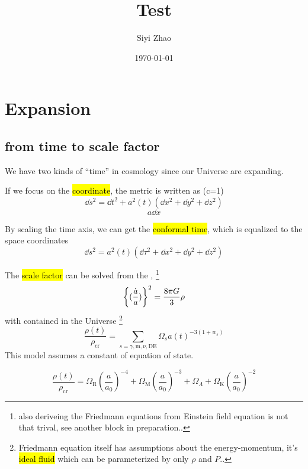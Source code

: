 
\title{Test}
\author{Siyi Zhao}
\date{\today}


\maketitle
\section{Expansion}

\subsection{from time to scale factor}

We have two kinds of ``time'' in cosmology since our Universe are expanding. 

If we focus on the \hl{coordinate}, the metric is written as (c=1)
\begin{equation}
    \dd s^2 = \dd t^2 + a^2(t) (\dd x^2 + \dd y^2 + \dd z^2)
\end{equation}
\begin{equation}
    a\dd{x}
\end{equation}


By scaling the time axis, we can get the \hl{conformal time}, which is equalized to the space coordinates
\begin{equation}
    \dd s^2 = a^2(t) (\dd \tau^2 + \dd x^2 + \dd y^2 + \dd z^2)
\end{equation}

The \hl{scale factor} can be solved from the , 
\footnote{also deriveing the Friedmann equations from Einstein field equation is not that trival, see another block in preparation..}
\begin{equation}
    \qty{(\frac{\dot{a}}{a})}^2 = \frac{8\pi G}{3} \rho
\end{equation}
with  contained in the Universe 
\footnote{Friedmann equation itself has assumptions about the energy-momentum, it's \hl{ideal fluid} which can be parameterized by only $\rho$ and $P$..}
\begin{equation}
    \frac{\rho(t)}{\rho_{\mathrm{cr}}} = \sum_{s=\gamma, \mathrm{m}, \nu, \mathrm{DE}} \Omega_{s} {a(t)}^{-3 (1 + w_{s})} 
\end{equation}
This model assumes a constant of equation of state. 


\begin{equation}
    \frac{\rho(t)}{\rho_{\mathrm{cr}}} = \Omega_{\mathrm{R}} \left(\frac{a}{a_0}\right)^{-4} + \Omega_{\mathrm{M}} \left(\frac{a}{a_0}\right)^{-3} + \Omega_\Lambda + \Omega_{\mathrm{K}} \left(\frac{a}{a_0}\right)^{ -2}
\end{equation}




